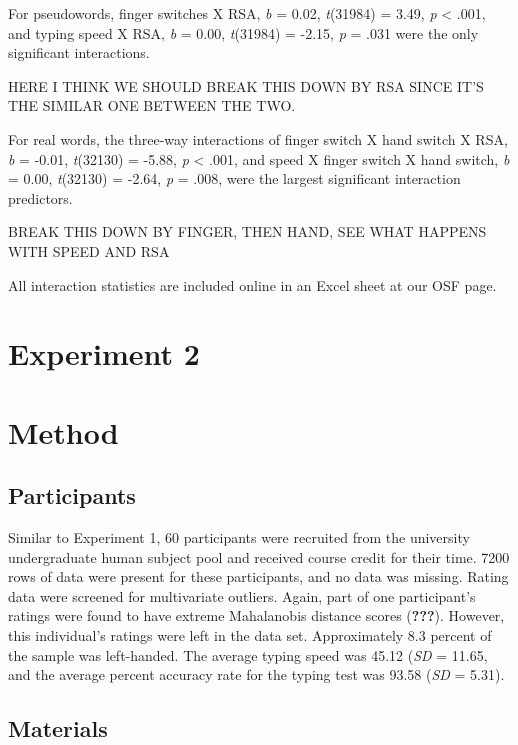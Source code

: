 \documentclass[english,man]{apa6}
\theoremstyle{definition}
\theoremstyle{definition}
\theoremstyle{definition}
\theoremstyle{remark}
\begin{document}
For pseudowords, finger switches X RSA, \emph{b} = 0.02, \emph{t}(31984)
= 3.49, \emph{p} \textless{} .001, and typing speed X RSA, \emph{b} =
0.00, \emph{t}(31984) = -2.15, \emph{p} = .031 were the only significant
interactions.

HERE I THINK WE SHOULD BREAK THIS DOWN BY RSA SINCE IT'S THE SIMILAR ONE
BETWEEN THE TWO.

For real words, the three-way interactions of finger switch X hand
switch X RSA, \emph{b} = -0.01, \emph{t}(32130) = -5.88, \emph{p}
\textless{} .001, and speed X finger switch X hand switch, \emph{b} =
0.00, \emph{t}(32130) = -2.64, \emph{p} = .008, were the largest
significant interaction predictors.

BREAK THIS DOWN BY FINGER, THEN HAND, SEE WHAT HAPPENS WITH SPEED AND
RSA

All interaction statistics are included online in an Excel sheet at our
OSF page.

\section{Experiment 2}\label{experiment-2}

\section{Method}\label{method-1}

\subsection{Participants}\label{participants-1}

Similar to Experiment 1, 60 participants were recruited from the
university undergraduate human subject pool and received course credit
for their time. 7200 rows of data were present for these participants,
and no data was missing. Rating data were screened for multivariate
outliers. Again, part of one participant's ratings were found to have
extreme Mahalanobis distance scores ({\textbf{???}}). However, this
individual's ratings were left in the data set. Approximately 8.3
percent of the sample was left-handed. The average typing speed was
45.12 (\emph{SD} = 11.65, and the average percent accuracy rate for the
typing test was 93.58 (\emph{SD} = 5.31).

\subsection{Materials}\label{materials-1}
\end{document}
